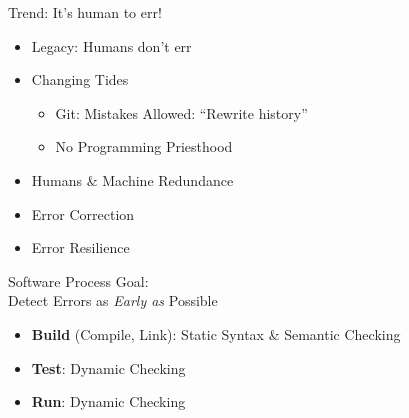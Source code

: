 \documentclass[xcolor=dvipsnames]{beamer}
\begin{document}
\begin{frame}[fragile]{Trend: It's human to err!}
  \begin{figure}
  \end{figure}
  \begin{itemize}[<+->]
  \item Legacy: Humans don't err
  \item Changing Tides
    \begin{itemize}[<+->]
    \item Git: Mistakes Allowed: ``Rewrite history''
    \item No Programming Priesthood
    \end{itemize}
  \item Humans \& Machine Redundance
  \item Error Correction
  \item Error Resilience
  \end{itemize}
\end{frame}

\begin{frame}[fragile]{Software Process Goal:\\Detect Errors as \emph{Early as} Possible}
  \begin{itemize}[<+->]
  \item \textbf{Build} (Compile, Link): Static Syntax \& Semantic Checking
  \item \textbf{Test}: Dynamic Checking
  \item \textbf{Run}: Dynamic Checking
  \end{itemize}
\end{frame}
\end{document}
